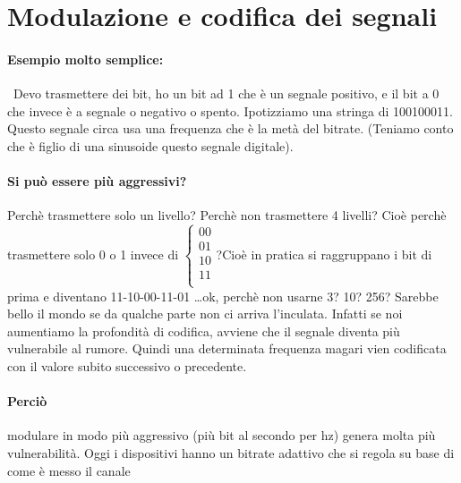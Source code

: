 \documentclass[12pt, a4paper, openany, twoside]{book}
\begin{document}
\section{Modulazione e codifica dei segnali}
\paragraph{Esempio molto semplice: } Devo trasmettere dei bit, ho un bit ad 1
che è un segnale positivo, e il bit a 0 che invece è a segnale o negativo o 
spento. Ipotizziamo una stringa di 100100011. Questo segnale circa usa una 
frequenza che è la metà del bitrate. (Teniamo conto che è figlio di una
sinusoide questo segnale digitale).
\paragraph{Si può essere più aggressivi?} Perchè trasmettere solo un livello? 
Perchè non trasmettere 4 livelli? Cioè perchè trasmettere solo 0 o 1 invece di 
$\begin{cases}
00\\
01\\
10\\
11\\
\end{cases}$?Cioè in pratica si raggruppano i bit di prima e diventano 11-10-00-11-01
\dots ok, perchè non usarne 3? 10? 256? Sarebbe bello il mondo se da qualche 
parte non ci arriva l'inculata. Infatti se noi aumentiamo la profondità di 
codifica, avviene che il segnale diventa più vulnerabile al rumore. Quindi una
determinata frequenza magari vien codificata con il valore subito successivo
o precedente. 
\paragraph{Perciò} modulare in modo più aggressivo (più bit al secondo per hz) 
genera molta più vulnerabilità. Oggi i dispositivi hanno un bitrate adattivo
che si regola su base di come è messo il canale
\end{document}
